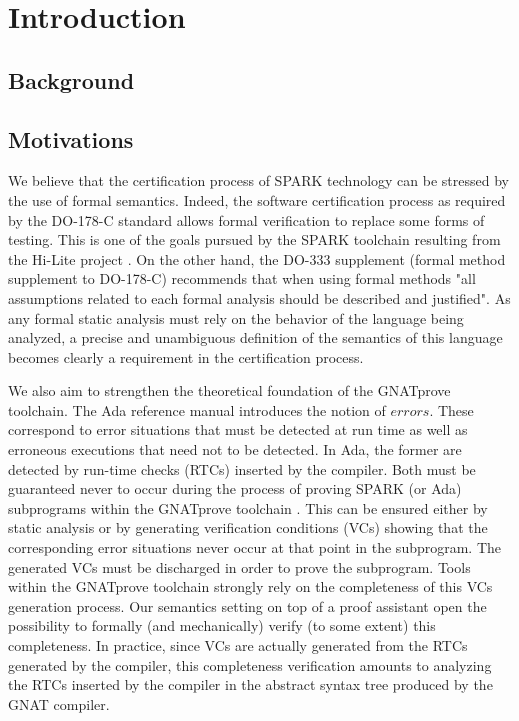 \section{Introduction}
\subsection{Background}

\subsection{Motivations}
We believe that the certification process of SPARK technology can be
stressed by the use of formal semantics.
Indeed, the software certification process as required by the DO-178-C \cite{RTCA:DO-178} 
standard allows formal verification to replace some forms of testing. 
This is one of the goals pursued by the SPARK toolchain resulting from 
the Hi-Lite project \cite{Hi-Lite:URL}. On the other hand, the DO-333 
supplement \cite{RTCA:DO-333} (formal method supplement to DO-178-C) recommends that 
when using formal methods "all assumptions related to each formal 
analysis should be described and justified". As any formal static 
analysis must rely on the behavior of the language being analyzed, a 
precise and unambiguous definition of the semantics of this language 
becomes clearly a requirement in the certification process.

We also aim to strengthen the theoretical foundation of the GNATprove
toolchain.
The Ada reference manual \cite{Ada:URL} introduces the notion of $\mathit{errors}$.
These correspond to error situations that must be detected 
at run time as well as erroneous executions that need not to be 
detected. In Ada, the former are detected by run-time checks 
(RTCs) inserted by the compiler. Both must be guaranteed never to
occur during the process of proving SPARK (or Ada) subprograms within
the GNATprove toolchain \cite{Gnatprove:URL}. This can be ensured either by static
analysis or by generating verification conditions (VCs) showing that 
the corresponding error situations never occur at that point in the 
subprogram. The generated VCs must be discharged in order to prove the 
subprogram.  Tools within the GNATprove toolchain strongly rely on the 
completeness of this VCs generation process. Our semantics setting on 
top of a proof assistant open the possibility to formally (and 
mechanically) verify (to some extent) this completeness. In practice, 
since VCs are actually generated from the RTCs generated by the 
compiler, this completeness verification amounts to analyzing the RTCs 
inserted by the compiler in the abstract syntax tree produced by the 
GNAT compiler.

